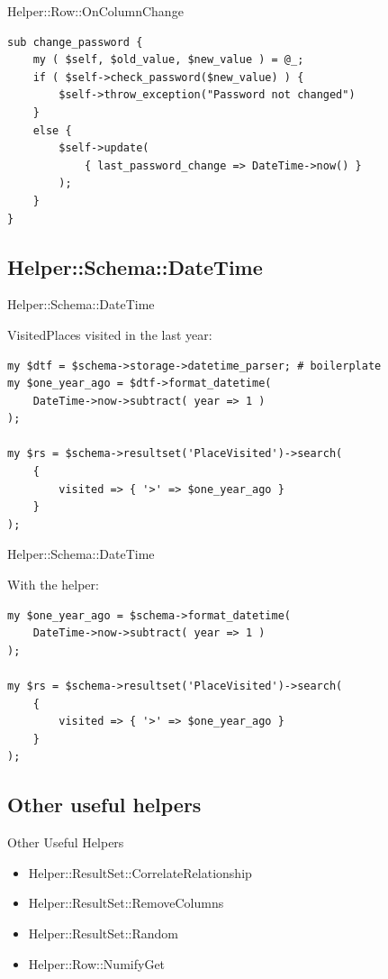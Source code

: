 \begin{frame}[fragile]{Helper::Row::OnColumnChange}
\begin{lstlisting}
sub change_password {
    my ( $self, $old_value, $new_value ) = @_;
    if ( $self->check_password($new_value) ) {
        $self->throw_exception("Password not changed")
    }
    else {
        $self->update(
            { last_password_change => DateTime->now() }
        );
    }
}
\end{lstlisting}
\end{frame}

\subsection{Helper::Schema::DateTime}

\begin{frame}[fragile]{Helper::Schema::DateTime}

VisitedPlaces visited in the last year:

\begin{lstlisting}
my $dtf = $schema->storage->datetime_parser; # boilerplate
my $one_year_ago = $dtf->format_datetime(
    DateTime->now->subtract( year => 1 )
);

my $rs = $schema->resultset('PlaceVisited')->search(
    {
        visited => { '>' => $one_year_ago }
    }
);
\end{lstlisting}
\end{frame}

\begin{frame}[fragile]{Helper::Schema::DateTime}

With the helper:

\begin{lstlisting}
my $one_year_ago = $schema->format_datetime(
    DateTime->now->subtract( year => 1 )
);

my $rs = $schema->resultset('PlaceVisited')->search(
    {
        visited => { '>' => $one_year_ago }
    }
);
\end{lstlisting}
\end{frame}

\subsection{Other useful helpers}
\begin{frame}{Other Useful Helpers}
\begin{itemize}
\item Helper::ResultSet::CorrelateRelationship
\item Helper::ResultSet::RemoveColumns
\item Helper::ResultSet::Random
\item Helper::Row::NumifyGet
\end{itemize}
\end{frame}

